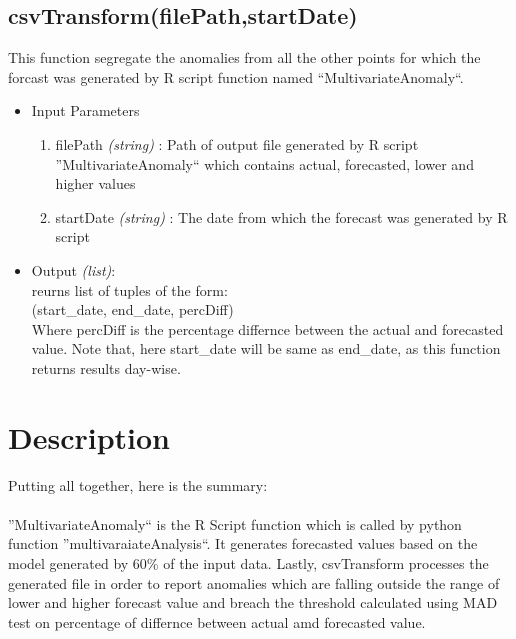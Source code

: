\subsection{csvTransform(filePath,startDate)}

This function segregate the anomalies from all the other points for which the forcast was 
generated by R script function named ``MultivariateAnomaly``.

\begin{itemize}
 \item Input Parameters
 
 \begin{enumerate}
  \item filePath \textit{(string)} : Path of output file generated by R script ''MultivariateAnomaly`` which contains actual, forecasted, lower and higher values  
  \item startDate \textit{(string)} : The date from which the forecast was generated by R script
 \end{enumerate}

 \item Output \textit{(list)}: \\
  reurns list of tuples of the form: \\
  (start\_date, end\_date, percDiff) \\
  Where percDiff is the percentage differnce between the actual and forecasted value.
  Note that, here start\_date will be same as end\_date, as this function 
returns results day-wise.
 

\end{itemize}


\section{Description}

Putting all together, here is the summary:\\
\\
''MultivariateAnomaly`` is the R Script function which is called by  python function ''multivaraiateAnalysis``.
It generates forecasted values based on the model generated by 60\% of the input data.
Lastly, csvTransform processes the generated file in order to report anomalies which are falling outside the range of lower
and higher forecast value and breach the threshold calculated using MAD test on percentage of differnce between actual amd 
forecasted value.